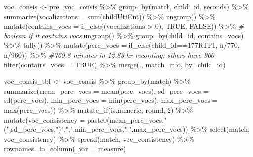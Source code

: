 \documentclass[
]{article}
\newenvironment{Shaded}{\begin{snugshade}}{\end{snugshade}}
\newcommand{\AttributeTok}[1]{\textcolor[rgb]{0.77,0.63,0.00}{#1}}
\newcommand{\CommentTok}[1]{\textcolor[rgb]{0.56,0.35,0.01}{\textit{#1}}}
\newcommand{\DecValTok}[1]{\textcolor[rgb]{0.00,0.00,0.81}{#1}}
\newcommand{\FunctionTok}[1]{\textcolor[rgb]{0.00,0.00,0.00}{#1}}
\newcommand{\NormalTok}[1]{#1}
\newcommand{\OtherTok}[1]{\textcolor[rgb]{0.56,0.35,0.01}{#1}}
\newcommand{\SpecialCharTok}[1]{\textcolor[rgb]{0.00,0.00,0.00}{#1}}
\newcommand{\StringTok}[1]{\textcolor[rgb]{0.31,0.60,0.02}{#1}}
\begin{document}
\begin{Shaded}
\begin{Highlighting}[]
\NormalTok{voc\_consis }\OtherTok{\textless{}{-}}\NormalTok{ pre\_voc\_consis }\SpecialCharTok{\%\textgreater{}\%}
  \FunctionTok{group\_by}\NormalTok{(match, child\_id, seconds) }\SpecialCharTok{\%\textgreater{}\%}
  \FunctionTok{summarize}\NormalTok{(}\AttributeTok{vocalizations =} \FunctionTok{sum}\NormalTok{(childUttCnt)) }\SpecialCharTok{\%\textgreater{}\%}
  \FunctionTok{ungroup}\NormalTok{() }\SpecialCharTok{\%\textgreater{}\%}
  \FunctionTok{mutate}\NormalTok{(}\AttributeTok{contains\_vocs =} \FunctionTok{if\_else}\NormalTok{((vocalizations }\SpecialCharTok{\textgreater{}} \DecValTok{0}\NormalTok{), }\StringTok{\textquotesingle{}TRUE\textquotesingle{}}\NormalTok{, }\StringTok{\textquotesingle{}FALSE\textquotesingle{}}\NormalTok{)) }\SpecialCharTok{\%\textgreater{}\%} \CommentTok{\# boolean if it contains vocs}
  \FunctionTok{ungroup}\NormalTok{() }\SpecialCharTok{\%\textgreater{}\%}
  \FunctionTok{group\_by}\NormalTok{(child\_id, contains\_vocs) }\SpecialCharTok{\%\textgreater{}\%}
  \FunctionTok{tally}\NormalTok{() }\SpecialCharTok{\%\textgreater{}\%}
  \FunctionTok{mutate}\NormalTok{(}\AttributeTok{perc\_vocs =} \FunctionTok{if\_else}\NormalTok{(child\_id}\SpecialCharTok{==}\StringTok{\textquotesingle{}177RTP1\textquotesingle{}}\NormalTok{, n}\SpecialCharTok{/}\DecValTok{770}\NormalTok{, n}\SpecialCharTok{/}\DecValTok{960}\NormalTok{)) }\SpecialCharTok{\%\textgreater{}\%} \CommentTok{\#769.8 minutes in 12.83 hr recording; others have 960}
  \FunctionTok{filter}\NormalTok{(contains\_vocs}\SpecialCharTok{==}\StringTok{\textquotesingle{}TRUE\textquotesingle{}}\NormalTok{) }\SpecialCharTok{\%\textgreater{}\%}
  \FunctionTok{merge}\NormalTok{(., match\_info, }\AttributeTok{by=}\StringTok{\textquotesingle{}child\_id\textquotesingle{}}\NormalTok{)}

\NormalTok{voc\_consis\_tbl }\OtherTok{\textless{}{-}}\NormalTok{ voc\_consis }\SpecialCharTok{\%\textgreater{}\%}
  \FunctionTok{group\_by}\NormalTok{(match) }\SpecialCharTok{\%\textgreater{}\%}
  \FunctionTok{summarize}\NormalTok{(}\AttributeTok{mean\_perc\_vocs =} \FunctionTok{mean}\NormalTok{(perc\_vocs),}
            \AttributeTok{sd\_perc\_vocs =} \FunctionTok{sd}\NormalTok{(perc\_vocs),}
            \AttributeTok{min\_perc\_vocs =} \FunctionTok{min}\NormalTok{(perc\_vocs),}
            \AttributeTok{max\_perc\_vocs =} \FunctionTok{max}\NormalTok{(perc\_vocs)) }\SpecialCharTok{\%\textgreater{}\%}
  \FunctionTok{mutate\_if}\NormalTok{(is.numeric, round, }\DecValTok{2}\NormalTok{) }\SpecialCharTok{\%\textgreater{}\%}
  \FunctionTok{mutate}\NormalTok{(}\AttributeTok{voc\_consistency =} \FunctionTok{paste0}\NormalTok{(mean\_perc\_vocs,}\StringTok{"("}\NormalTok{,sd\_perc\_vocs,}\StringTok{")"}\NormalTok{,}\StringTok{","}\NormalTok{,min\_perc\_vocs,}\StringTok{"{-}"}\NormalTok{,max\_perc\_vocs)) }\SpecialCharTok{\%\textgreater{}\%}
  \FunctionTok{select}\NormalTok{(match, voc\_consistency) }\SpecialCharTok{\%\textgreater{}\%}
  \FunctionTok{spread}\NormalTok{(match, voc\_consistency) }\SpecialCharTok{\%\textgreater{}\%}
  \FunctionTok{rownames\_to\_column}\NormalTok{(.,}\AttributeTok{var =} \StringTok{\textquotesingle{}measure\textquotesingle{}}\NormalTok{)}
\end{Highlighting}
\end{Shaded}
\end{document}
